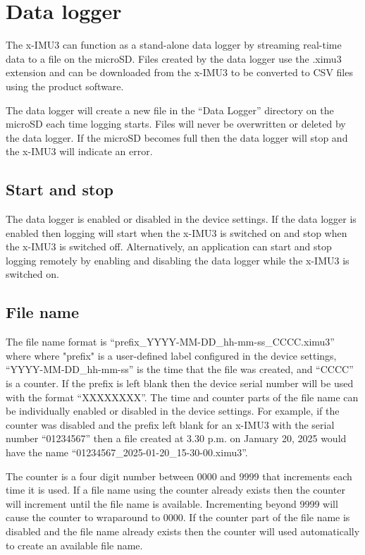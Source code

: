 \section{Data logger}
\label{sec:dataLogger}

The x-IMU3 can function as a stand-alone data logger by streaming real-time data to a file on the \ac{microSD}.  Files created by the data logger use the .ximu3 extension and can be downloaded from the x-IMU3 to be converted to \ac{CSV} files using the product software.

The data logger will create a new file in the \enquote{Data Logger} directory on the \ac{microSD} each time logging starts.  Files will never be overwritten or deleted by the data logger.  If the \ac{microSD} becomes full then the data logger will stop and the x-IMU3 will indicate an error.

\subsection{Start and stop}

The data logger is enabled or disabled in the device settings.  If the data logger is enabled then logging will start when the x-IMU3 is switched on and stop when the x-IMU3 is switched off.  Alternatively, an application can start and stop logging remotely by enabling and disabling the data logger while the x-IMU3 is switched on.

\subsection{File name}
\label{sec:fileName}

The file name format is \enquote{prefix\_YYYY-MM-DD\_hh-mm-ss\_CCCC.ximu3} where where "prefix" is a user-defined label configured in the device settings, \enquote{YYYY-MM-DD\_hh-mm-ss} is the time that the file was created, and \enquote{CCCC} is a counter.  If the prefix is left blank then the device serial number will be used with the format \enquote{XXXXXXXX}.  The time and counter parts of the file name can be individually enabled or disabled in the device settings.  For example, if the counter was disabled and the prefix left blank for an x-IMU3 with the serial number \enquote{01234567} then a file created at 3.30 p.m. on January 20, 2025 would have the name \enquote{01234567\_2025-01-20\_15-30-00.ximu3}.

The counter is a four digit number between 0000 and 9999 that increments each time it is used.  If a file name using the counter already exists then the counter will increment until the file name is available.  Incrementing beyond 9999 will cause the counter to wraparound to 0000.  If the counter part of the file name is disabled and the file name already exists then the counter will used automatically to create an available file name.


